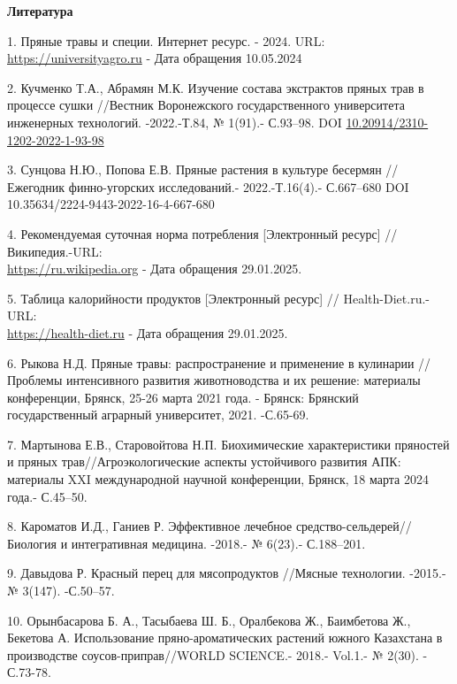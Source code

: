 \begin{center}
{\bfseries Литература}
\end{center}

\begin{references}
1. Пряные травы и специи. Интернет ресурс. - 2024.
URL: \href{https://universityagro.ru/овощеводство/пряные-травы-и-специи/?ysclid=lw61pt05hp351265197}{https://universityagro.ru} - Дата обращения
10.05.2024

2. Кучменко Т.А., Абрамян М.К. Изучение состава экстрактов пряных трав в
процессе сушки //Вестник Воронежского государственного университета
инженерных технологий. -2022.-Т.84, № 1(91).- С.93--98. DOI
\href{http://doi.org/10.20914/2310-1202-2022-1-93-98}{10.20914/2310-1202-2022-1-93-98}

3. Сунцова Н.Ю., Попова Е.В. Пряные растения в культуре бесермян //
Ежегодник финно-угорских исследований.- 2022.-Т.16(4).- С.667--680 DOI
10.35634/2224-9443-2022-16-4-667-680

4. Рекомендуемая суточная норма потребления {[}Электронный
ресурс{]} // Википедия.-URL:\\
\href{https://ru.wikipedia.org/wiki/Рекомендуемая\_суточная\_норма\_потребления}{https://ru.wikipedia.org} -
Дата обращения 29.01.2025.

5. Таблица калорийности продуктов {[}Электронный
ресурс{]} // Health-Diet.ru.- URL:\\
\href{https://health-diet.ru/table_calorie_users/2314523/}{https://health-diet.ru} - Дата
обращения 29.01.2025.

6. Рыкова Н.Д. Пряные травы: распространение и применение в кулинарии
//Проблемы интенсивного развития животноводства и их решение: материалы
конференции, Брянск, 25-26 марта 2021 года. - Брянск: Брянский
государственный аграрный университет, 2021. -С.65-69.

7. Мартынова Е.В., Старовойтова Н.П. Биохимические характеристики
пряностей и пряных трав//Агроэкологические аспекты устойчивого развития
АПК: материалы XXI международной научной конференции, Брянск, 18 марта
2024 года.- С.45--50.

8. Кароматов И.Д., Ганиев Р. Эффективное лечебное
средство-сельдерей//Биология и интегративная медицина. -2018.- № 6(23).-
С.188--201.

9. Давыдова Р. Красный перец для мясопродуктов //Мясные технологии.
-2015.- № 3(147). -С.50--57.

10. Орынбасарова Б. А., Тасыбаева Ш. Б., Оралбекова Ж., Баимбетова Ж.,
Бекетова А. Использование пряно-ароматических растений южного Казахстана
в производстве соусов-приправ//WORLD SCIENCE.- 2018.- Vol.1.- № 2(30). -
С.73-78.


\end{references}
